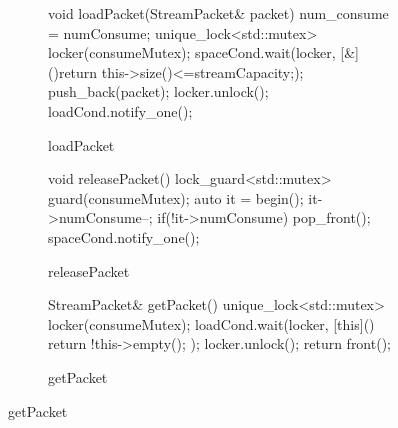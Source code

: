 \begin{figure}[!htp]
  \centering
  \begin{subfigure}{0.32\textwidth}
    \centering
    
\begin{codeblock}[language=C, basicstyle=\ttfamily\tiny]
void loadPacket(StreamPacket& packet) 
{
    num_consume = numConsume;
    unique_lock<std::mutex> locker(consumeMutex);
    spaceCond.wait(locker, [&](){return this->size()<=streamCapacity;});
    push_back(packet);
    locker.unlock();
    loadCond.notify_one();
}
\end{codeblock}

    \caption{loadPacket}
  \end{subfigure}
  \begin{subfigure}{0.32\textwidth}
    \centering
    
\begin{codeblock}[language=C, basicstyle=\ttfamily\tiny]
void releasePacket()
{
    {
        lock_guard<std::mutex> guard(consumeMutex);
        auto it = begin();
        it->numConsume--;
        if(!it->numConsume)
            pop_front();
    }
    spaceCond.notify_one();
}
\end{codeblock}

    \caption{releasePacket}
  \end{subfigure}
  \begin{subfigure}{0.32\textwidth}
    \centering
    
\begin{codeblock}[language=C, basicstyle=\ttfamily\tiny]
StreamPacket& getPacket()
{
    unique_lock<std::mutex> locker(consumeMutex);
    loadCond.wait(locker, [this](){ 
        return !this->empty();
    });
    locker.unlock();
    return front();
}
\end{codeblock}

    \caption{getPacket}
  \end{subfigure}
  
  \label{fig:stream_code}
\end{figure}

